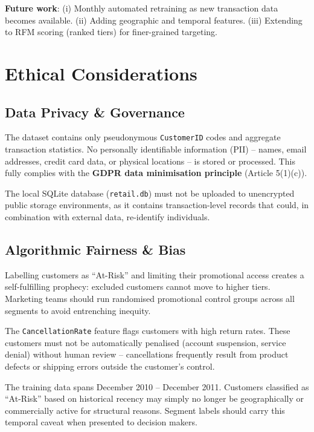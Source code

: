 \documentclass[12pt,a4paper]{report}
\begin{document}
\textbf{Future work}: (i) Monthly automated retraining as new transaction data becomes available. (ii) Adding geographic and temporal features. (iii) Extending to RFM scoring (ranked tiers) for finer-grained targeting.

\chapter{Ethical Considerations}

\section{Data Privacy \& Governance}

The dataset contains only pseudonymous \texttt{CustomerID} codes and aggregate transaction statistics. No personally identifiable information (PII) -- names, email addresses, credit card data, or physical locations -- is stored or processed. This fully complies with the \textbf{GDPR data minimisation principle} (Article 5(1)(c)).

The local SQLite database (\texttt{retail.db}) must not be uploaded to unencrypted public storage environments, as it contains transaction-level records that could, in combination with external data, re-identify individuals.

\section{Algorithmic Fairness \& Bias}

\begin{description}[leftmargin=1.8em]
  \item[Feedback loop risk] Labelling customers as ``At-Risk'' and limiting their promotional access creates a self-fulfilling prophecy: excluded customers cannot move to higher tiers. Marketing teams should run randomised promotional control groups across all segments to avoid entrenching inequity.

  \item[Cancellation rate stigma] The \texttt{CancellationRate} feature flags customers with high return rates. These customers must not be automatically penalised (account suspension, service denial) without human review -- cancellations frequently result from product defects or shipping errors outside the customer's control.

  \item[Temporal displacement] The training data spans December 2010 -- December 2011. Customers classified as ``At-Risk'' based on historical recency may simply no longer be geographically or commercially active for structural reasons. Segment labels should carry this temporal caveat when presented to decision makers.
\end{description}
\end{document}
